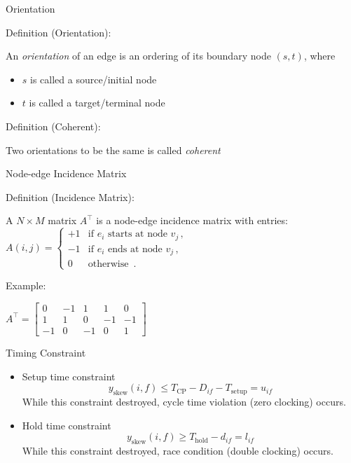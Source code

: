 \documentclass[10pt,ignorenonframetext,mathserif]{beamer}
\providecommand{\tightlist}{%
  \setlength{\itemsep}{0pt}\setlength{\parskip}{0pt}}
\begin{document}
\begin{frame}{Orientation}

\begin{block}{Definition (Orientation):}

An \emph{orientation} of an edge is an ordering of its boundary node
\((s, t)\), where

\begin{itemize}
\tightlist
\item
  \(s\) is called a source/initial node
\item
  \(t\) is called a target/terminal node
\end{itemize}

\end{block}

\begin{block}{Definition (Coherent):}

Two orientations to be the same is called \emph{coherent}

\end{block}

\end{frame}

\begin{frame}{Node-edge Incidence Matrix}

\begin{block}{Definition (Incidence Matrix):}

A \(N \times M\) matrix \(A^\top\) is a node-edge incidence matrix with
entries:
\(A(i,j) = \begin{cases} +1 & \text{if } e_i \text{ starts at node } v_j \,, \\ -1 & \text{if } e_i \text{ ends at node } v_j \,, \\ 0 & \text{otherwise } \,. \end{cases}\)

\end{block}

\begin{block}{Example:}

\(A^\top = \begin{bmatrix} 0 & -1 & 1 & 1 & 0 \\ 1 & 1 & 0 & -1 & -1 \\ -1 & 0 & -1 & 0 & 1 \end{bmatrix}\)

\end{block}

\end{frame}

\begin{frame}{Timing Constraint}

\begin{itemize}
\tightlist
\item
  Setup time constraint
  \[y_\text{skew}(i,f) \le T_\text{CP} - D_{if} - T_\text{setup} = u_{if}\] While this
  constraint destroyed, cycle time violation (zero clocking) occurs.
\item
  Hold time constraint \[y_\text{skew}(i,f) \ge T_\text{hold} - d_{if} = l_{if}\]
  While this constraint destroyed, race condition (double clocking)
  occurs.
\end{itemize}

\end{frame}
\end{document}
